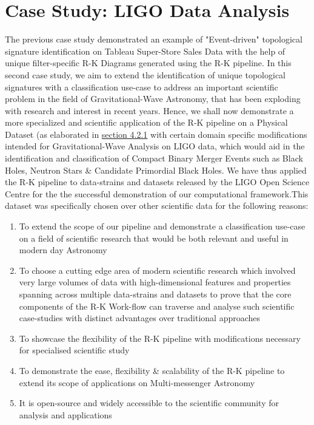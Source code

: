     \section{Case Study: LIGO Data Analysis}

    The previous case study demonstrated an example of "Event-driven" topological signature identification on Tableau Super-Store Sales Data \cite{TableauSuperStore} with the help of unique filter-specific R-K Diagrams generated using the R-K pipeline. In this second case study, we aim to extend the identification of unique topological signatures with a classification use-case to address an important scientific problem in the field of Gravitational-Wave Astronomy, that has been exploding with research and interest in recent years. \cite{00.3_GravitationalWaveResearch}\cite{00.4_GWRevolution} Hence, we shall now demonstrate a more specialized and scientific application of the R-K pipeline on a  Physical Dataset (as elaborated in \hyperref[sec:PhysicalSystems]{section 4.2.1} with certain domain specific modifications intended for  Gravitational-Wave Analysis\cite{00.1_2012GWAnalysisFormalism} \cite{00.2_schutz2012GWDataAnalysis} on LIGO data, which would aid in the identification and classification of  Compact Binary Merger Events \cite{24.0_BinaryMergerIdentification} \cite{24.1_BinaryMergerClassify} such as Black Holes, Neutron Stars \& Candidate Primordial Black Holes. We have thus applied the R-K pipeline to data-strains and datasets released by the LIGO Open Science Centre \cite{01.5_LIGOOpenSci} \cite{00_LIGOOpenSciData} for the the successful demonstration of our computational framework.This dataset was specifically chosen over other scientific data for the following reasons:

    \begin{enumerate}
        \item {To extend the scope of our pipeline and demonstrate a classification use-case on a field of scientific research that would be both relevant and useful in modern day Astronomy}
        \item{To choose a cutting edge area of modern scientific research which involved very large volumes of data with high-dimensional features and properties spanning across multiple data-strains and datasets to prove that the core components of the R-K Work-flow can traverse and analyse such scientific case-studies with distinct advantages over traditional approaches}
        \item {To showcase the flexibility of the R-K pipeline with modifications necessary for specialised scientific study}
        \item{To demonstrate the ease, flexibility \& scalability of the R-K pipeline to extend its scope of applications on Multi-messenger Astronomy }
        \item{It is open-source and widely accessible to the scientific community for analysis and applications }
    \end{enumerate}

